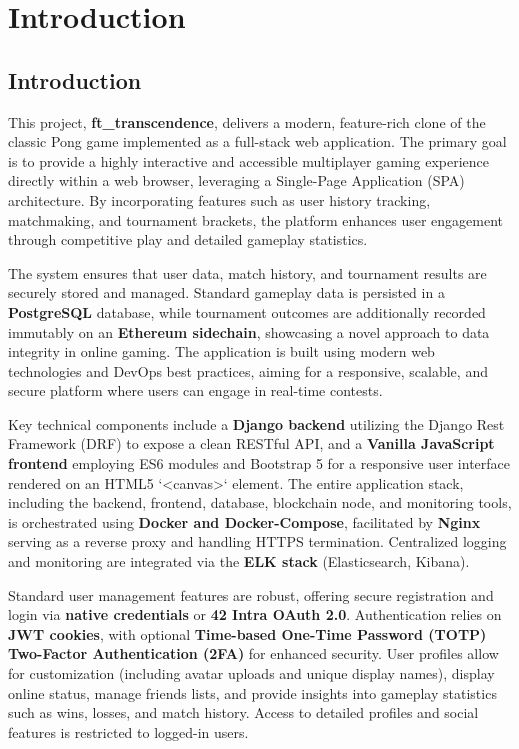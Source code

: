 




\chapter{Introduction} %
\section{Introduction}

This project, \textbf{ft\_transcendence}, delivers a modern, feature-rich clone of the classic Pong game implemented as a full-stack web application. The primary goal is to provide a highly interactive and accessible multiplayer gaming experience directly within a web browser, leveraging a Single-Page Application (SPA) architecture. By incorporating features such as user history tracking, matchmaking, and tournament brackets, the platform enhances user engagement through competitive play and detailed gameplay statistics.

The system ensures that user data, match history, and tournament results are securely stored and managed. Standard gameplay data is persisted in a \textbf{PostgreSQL} database, while tournament outcomes are additionally recorded immutably on an \textbf{Ethereum sidechain}, showcasing a novel approach to data integrity in online gaming. The application is built using modern web technologies and DevOps best practices, aiming for a responsive, scalable, and secure platform where users can engage in real-time contests.

Key technical components include a \textbf{Django backend} utilizing the Django Rest Framework (DRF) to expose a clean RESTful API, and a \textbf{Vanilla JavaScript frontend} employing ES6 modules and Bootstrap 5 for a responsive user interface rendered on an HTML5 `<canvas>` element. The entire application stack, including the backend, frontend, database, blockchain node, and monitoring tools, is orchestrated using \textbf{Docker and Docker-Compose}, facilitated by \textbf{Nginx} serving as a reverse proxy and handling HTTPS termination. Centralized logging and monitoring are integrated via the \textbf{ELK stack} (Elasticsearch, Kibana).

Standard user management features are robust, offering secure registration and login via \textbf{native credentials} or \textbf{42 Intra OAuth 2.0}. Authentication relies on \textbf{JWT cookies}, with optional \textbf{Time-based One-Time Password (TOTP) Two-Factor Authentication (2FA)} for enhanced security. User profiles allow for customization (including avatar uploads and unique display names), display online status, manage friends lists, and provide insights into gameplay statistics such as wins, losses, and match history. Access to detailed profiles and social features is restricted to logged-in users.


